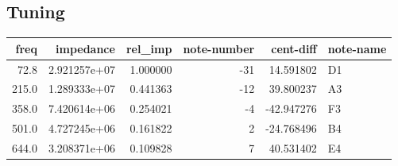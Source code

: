 \documentclass{article}
\begin{document}
\subsection{Tuning}
\begin{centering}
\begin{tabular}{rrrrrl}
\toprule
 freq &    impedance &  rel\_imp &  note-number &  cent-diff & note-name \\
\midrule
 72.8 & 2.921257e+07 & 1.000000 &          -31 &  14.591802 &        D1 \\
215.0 & 1.289333e+07 & 0.441363 &          -12 &  39.800237 &        A3 \\
358.0 & 7.420614e+06 & 0.254021 &           -4 & -42.947276 &        F3 \\
501.0 & 4.727245e+06 & 0.161822 &            2 & -24.768496 &        B4 \\
644.0 & 3.208371e+06 & 0.109828 &            7 &  40.531402 &        E4 \\
\bottomrule
\end{tabular}
\end{centering}
\end{document}
